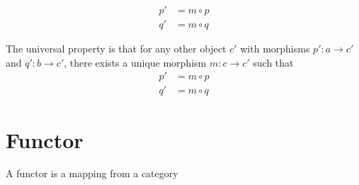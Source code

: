 \documentclass{article}
\begin{document}
\begin{minipage}{0.5\textwidth}
\end{minipage}
\begin{minipage}{0.5\textwidth}
    \begin{align*}
        p' &= m \circ p \\
        q' &= m \circ q
    \end{align*}
\end{minipage}

The universal property is that for any other object \(c'\)
with morphisms \(p':a \to c'\) and \(q':b \to c'\),
there exists a unique morphism \(m:c \to c'\)
such that
\begin{align*}
    p' &= m \circ p \\
    q' &= m \circ q
\end{align*}

\section{Functor}

A functor is a mapping from a category
\end{document}
